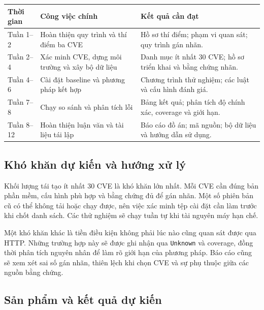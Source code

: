 \documentclass[11pt,a4paper]{article}
\begin{document}
\begin{center}
\small
\begin{tabularx}{\linewidth}{@{}P{1.9cm}P{4.1cm}Y@{}}
\toprule
\textbf{Thời gian} & \textbf{Công việc chính} & \textbf{Kết quả cần đạt} \\
\midrule
Tuần 1--2 & Hoàn thiện quy trình và thí điểm ba CVE & Hồ sơ thí điểm; phạm vi quan sát; quy trình gán nhãn. \\
Tuần 2--4 & Xác minh CVE, dựng môi trường và xây bộ dữ liệu & Danh mục ít nhất 30 CVE; hồ sơ triển khai và bằng chứng nhãn. \\
Tuần 4--6 & Cài đặt baseline và phương pháp kết hợp & Chương trình thử nghiệm; các luật và cấu hình đánh giá. \\
Tuần 7--8 & Chạy so sánh và phân tích lỗi & Bảng kết quả; phân tích độ chính xác, coverage và giới hạn. \\
Tuần 8--12 & Hoàn thiện luận văn và tài liệu tái lập & Báo cáo đồ án; mã nguồn; bộ dữ liệu và hướng dẫn sử dụng. \\
\bottomrule
\end{tabularx}
\end{center}

\subsection{Khó khăn dự kiến và hướng xử lý}

Khối lượng tái tạo ít nhất 30 CVE là khó khăn lớn nhất. Mỗi CVE cần đúng bản phần mềm, cấu hình phù hợp và bằng chứng đủ để gán nhãn. Một số phiên bản cũ có thể không tải hoặc chạy được, nên việc xác minh tệp cài đặt cần làm trước khi chốt danh sách. Các thử nghiệm sẽ chạy tuần tự khi tài nguyên máy hạn chế.

Một khó khăn khác là tiền điều kiện không phải lúc nào cũng quan sát được qua HTTP. Những trường hợp này sẽ được ghi nhận qua \texttt{Unknown} và coverage, đồng thời phân tích nguyên nhân để làm rõ giới hạn của phương pháp. Báo cáo cũng sẽ xem xét sai số gán nhãn, thiên lệch khi chọn CVE và sự phụ thuộc giữa các nguồn bằng chứng.

\subsection{Sản phẩm và kết quả dự kiến}
\end{document}
